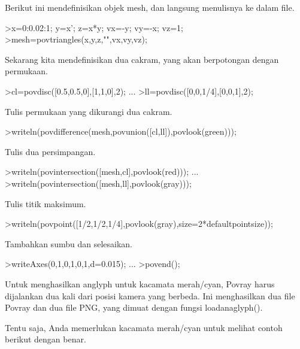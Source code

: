 \documentclass{article}
\begin{document}
\begin{eulernotebook}
\begin{eulercomment}
\begin{eulercomment}
\begin{eulercomment}
Berikut ini mendefinisikan objek mesh, dan langsung menulisnya ke
dalam file.
\end{eulercomment}
\begin{eulerprompt}
>x=0:0.02:1; y=x'; z=x*y; vx=-y; vy=-x; vz=1;
>mesh=povtriangles(x,y,z,"",vx,vy,vz);
\end{eulerprompt}
\begin{eulercomment}
Sekarang kita mendefinisikan dua cakram, yang akan berpotongan dengan
permukaan.
\end{eulercomment}
\begin{eulerprompt}
>cl=povdisc([0.5,0.5,0],[1,1,0],2); ...
>ll=povdisc([0,0,1/4],[0,0,1],2);
\end{eulerprompt}
\begin{eulercomment}
Tulis permukaan yang dikurangi dua cakram.
\end{eulercomment}
\begin{eulerprompt}
>writeln(povdifference(mesh,povunion([cl,ll]),povlook(green)));
\end{eulerprompt}
\begin{eulercomment}
Tulis dua persimpangan.
\end{eulercomment}
\begin{eulerprompt}
>writeln(povintersection([mesh,cl],povlook(red))); ...
>writeln(povintersection([mesh,ll],povlook(gray)));
\end{eulerprompt}
\begin{eulercomment}
Tulis titik maksimum.
\end{eulercomment}
\begin{eulerprompt}
>writeln(povpoint([1/2,1/2,1/4],povlook(gray),size=2*defaultpointsize));
\end{eulerprompt}
\begin{eulercomment}
Tambahkan sumbu dan selesaikan.
\end{eulercomment}
\begin{eulerprompt}
>writeAxes(0,1,0,1,0,1,d=0.015); ...
>povend();
\end{eulerprompt}
\begin{eulercomment}
Untuk menghasilkan anglyph untuk kacamata merah/cyan, Povray harus
dijalankan dua kali dari posisi kamera yang berbeda. Ini menghasilkan
dua file Povray dan dua file PNG, yang dimuat dengan fungsi
loadanaglyph().

Tentu saja, Anda memerlukan kacamata merah/cyan untuk melihat contoh
berikut dengan benar.


\end{eulercomment}
\end{eulercomment}
\end{eulercomment}
\end{eulernotebook}
\end{document}
